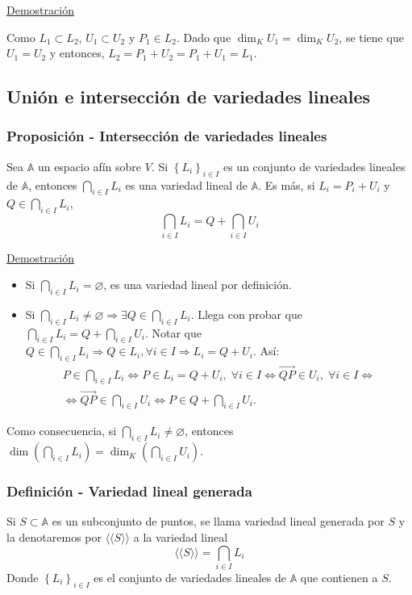 \documentclass[12pt, a4paper, ones, notitlepage, openany,titlepage]{article}
\newcommand{\demostracion}{\noindent\underline{Demostración}}
\begin{document}
\demostracion

Como $L_1 \subset L_2$, $U_{1} \subset U_{2}$ y $P_{1} \in L_{2}$. Dado que $\dim _{K} U_{1}=\dim _{K} U_{2}$, se tiene que $U_{1}=U_{2}$ y entonces, $L_{2}=P_{1}+U_{2}=P_{1}+U_{1}=L_{1}$.

\subsection{Unión e intersección de variedades lineales}

\subsubsection{Proposición - Intersección de variedades lineales}
Sea $\mathbb{A}$ un espacio afín sobre $V$. Si $\left\{L_{i}\right\}_{i \in I}$ es un conjunto de variedades lineales de $\mathbb{A}$, entonces $\displaystyle\bigcap_{i \in I} L_{i}$ es una variedad lineal de $\mathbb{A}$. Es más, si $L_{i}=P_{i}+U_{i}$ y $Q \in \displaystyle \bigcap_{i \in I} L_{i}$,
$$
\bigcap_{i \in I} L_{i}=Q+\bigcap_{i \in I} U_{i}
$$

\demostracion
\begin{itemize}
	\item Si $\displaystyle\bigcap_{i \in I} L_i = \varnothing$, es una variedad lineal por definición.
	\item Si $\displaystyle\bigcap_{i \in I}L_i \neq \varnothing \Longrightarrow \exists Q \in \bigcap_{i \in I}L_i$. Llega con probar que $\displaystyle \bigcap_{i \in I}L_i = Q + \bigcap_{i \in I}U_i$. Notar que $\displaystyle Q \in \bigcap_{i \in I}L_i \Longrightarrow Q \in L_i, \forall i \in I \Longrightarrow L_i = Q + U_i$. Así:
	\begin{gather*}
		P \in \bigcap_{i \in I} L_{i} \Longleftrightarrow P \in L_{i} = Q + U_i, \; \forall i \in I \Longleftrightarrow \overrightarrow{Q P} \in U_{i}, \; \forall i \in I \Longleftrightarrow \\
		\Longleftrightarrow \overrightarrow{Q P} \in \bigcap_{i \in I} U_{i} \Longleftrightarrow P \in Q+\bigcap_{i \in I} U_{i} .
	\end{gather*}
	
\end{itemize}
Como consecuencia, si $\displaystyle \bigcap_{i \in I} L_{i} \neq \varnothing$, entonces $\displaystyle 
\dim \left(\bigcap_{i \in I} L_{i}\right)=\dim _{K}\left(\bigcap_{i \in I} U_{i}\right)$.

\subsubsection{Definición - Variedad lineal generada}
Si $S \subset \mathbb{A}$ es un subconjunto de puntos, se llama variedad lineal generada por $S$ y la denotaremos por $\langle\langle S\rangle\rangle$ a la variedad lineal
$$
\langle\langle S\rangle\rangle=\bigcap_{i \in I} L_{i}
$$
\noindent Donde $\left\{L_{i}\right\}_{i \in I}$ es el conjunto de variedades lineales de $\mathbb{A}$ que contienen a $S$.
\end{document}

